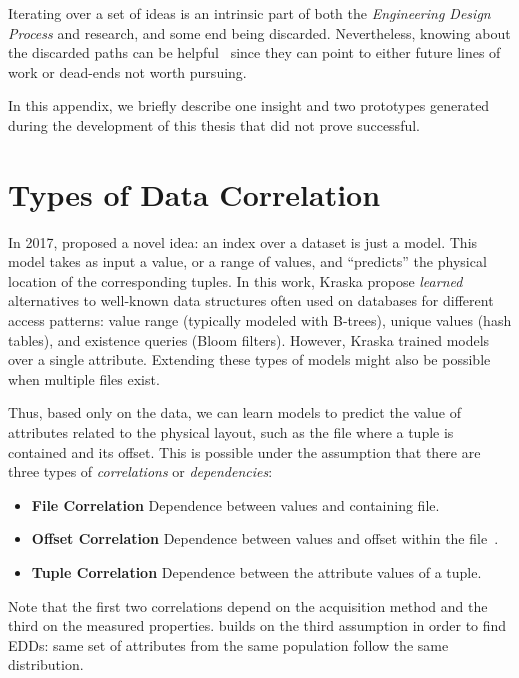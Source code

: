 Iterating over a set of ideas is an intrinsic part of both the
\emph{Engineering Design Process} and research, and some end being discarded.
Nevertheless, knowing about the discarded paths can be helpful~\cite{conroy_three_2020}
since they can point to either future lines of work or dead-ends not worth pursuing.

In this appendix, we briefly describe one insight and two prototypes generated during
the development of this thesis that did not prove successful.

\section{Types of Data Correlation}

In 2017, \cite{kraska_case_2018} proposed a novel idea: an index over a dataset
is just a model. This model takes as input a value, or a range of values,
and ``predicts'' the physical location of the corresponding tuples.
In this work, Kraska \etal propose \emph{learned} alternatives to well-known data
structures often used on databases for different access patterns:
value range (typically modeled with B-trees), unique values (hash tables),
and existence queries (Bloom filters).
However, Kraska \etal trained models over a single attribute.
Extending these types of models might also be possible when multiple files exist.

Thus, based only on the data, we can learn models to predict the value of
attributes related to the physical layout, such as the file where a tuple is contained and its offset.
This is possible under the assumption that there are three types of \emph{correlations}
or \emph{dependencies}:

\begin{itemize}
    \item \textbf{File Correlation} Dependence between values and containing file.
    \item \textbf{Offset Correlation} Dependence between values and offset within the
        file~\cite{kraska_case_2018}.
    \item \textbf{Tuple Correlation} Dependence between the attribute values of a tuple.
\end{itemize}

Note that the first two correlations depend on the acquisition method and the third
on the measured properties.
\PresQ builds on the third assumption in order to find \glspl{EDD}: same set of attributes
from the same population follow the same distribution.

